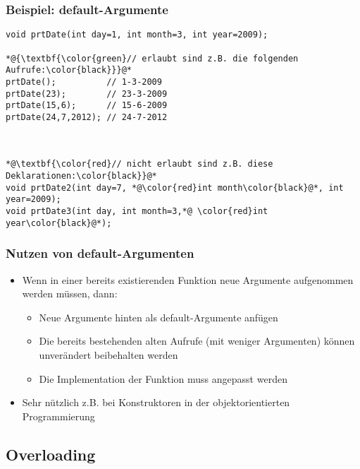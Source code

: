 \subsubsection{Beispiel: default-Argumente\hfill}
\label{sec:unterunterabschnitt}
\noindent
\begin{minipage}{\linewidth}
\begin{lstlisting}
void prtDate(int day=1, int month=3, int year=2009);
	
*@{\textbf{\color{green}// erlaubt sind z.B. die folgenden Aufrufe:\color{black}}}@*
prtDate();			// 1-3-2009
prtDate(23);		// 23-3-2009
prtDate(15,6);		// 15-6-2009
prtDate(24,7,2012);	// 24-7-2012

	

*@\textbf{\color{red}// nicht erlaubt sind z.B. diese Deklarationen:\color{black}}@*
void prtDate2(int day=7, *@\color{red}int month\color{black}@*, int year=2009);
void prtDate3(int day, int month=3,*@ \color{red}int year\color{black}@*);
\end{lstlisting}
\end{minipage}

\subsubsection{Nutzen von default-Argumenten\hfill}
\label{sec:unterunterabschnitt}
\begin{itemize}
	\item Wenn in einer bereits existierenden Funktion neue Argumente aufgenommen werden müssen, dann:
	\begin{itemize}
		\item Neue Argumente hinten als default-Argumente anfügen
		\item Die bereits bestehenden alten Aufrufe (mit weniger Argumenten) können unverändert beibehalten werden
		\item Die Implementation der Funktion muss angepasst werden
	\end{itemize}
	\item Sehr nützlich z.B. bei Konstruktoren in der objektorientierten Programmierung
\end{itemize}


\subsection{Overloading\hfill}
\label{sec:unterabschnitt}

